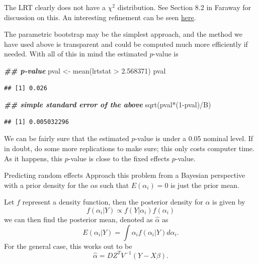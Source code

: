 \documentclass[
  ignorenonframetext,
]{beamer}
\newenvironment{Shaded}{\begin{snugshade}}{\end{snugshade}}
\newcommand{\DecValTok}[1]{\textcolor[rgb]{0.00,0.00,0.81}{#1}}
\newcommand{\DocumentationTok}[1]{\textcolor[rgb]{0.56,0.35,0.01}{\textbf{\textit{#1}}}}
\newcommand{\FloatTok}[1]{\textcolor[rgb]{0.00,0.00,0.81}{#1}}
\newcommand{\FunctionTok}[1]{\textcolor[rgb]{0.00,0.00,0.00}{#1}}
\newcommand{\NormalTok}[1]{#1}
\newcommand{\OtherTok}[1]{\textcolor[rgb]{0.56,0.35,0.01}{#1}}
\newcommand{\SpecialCharTok}[1]{\textcolor[rgb]{0.00,0.00,0.00}{#1}}
\begin{document}
\begin{frame}[fragile]{}
\protect\hypertarget{section-6}{}
The LRT clearly does not have a \(\chi^2\) distribution. See Section 8.2
in Faraway for discussion on this. An interesting refinement can be seen
\href{https://www.sciencedirect.com/science/article/pii/S0167947307004306?casa_token=z-BkV1gXcLQAAAAA:FbUGOMy6WR2WFBfIZ2e1OfpJBpzhhQd4zc3OFtNjUGiaCdlXKa4yQOwbw3xcgPXQ-JaZMbUuLQ}{here}.

The parametric bootstrap may be the simplest approach, and the method we
have used above is transparent and could be computed much more
efficiently if needed. With all of this in mind the estimated
\(p\)-value is

\vspace{12pt}
\tiny

\begin{Shaded}
\begin{Highlighting}[]
\DocumentationTok{\#\# p{-}value}
\NormalTok{pval }\OtherTok{\textless{}{-}} \FunctionTok{mean}\NormalTok{(lrtstat }\SpecialCharTok{\textgreater{}} \FloatTok{2.568371}\NormalTok{)}
\NormalTok{pval}
\end{Highlighting}
\end{Shaded}

\begin{verbatim}
## [1] 0.026
\end{verbatim}

\begin{Shaded}
\begin{Highlighting}[]
\DocumentationTok{\#\# simple standard error of the above}
\FunctionTok{sqrt}\NormalTok{(pval}\SpecialCharTok{*}\NormalTok{(}\DecValTok{1}\SpecialCharTok{{-}}\NormalTok{pval)}\SpecialCharTok{/}\NormalTok{B)}
\end{Highlighting}
\end{Shaded}

\begin{verbatim}
## [1] 0.005032296
\end{verbatim}

\vspace{12pt}
\normalsize

We can be fairly sure that the estimated \(p\)-value is under a 0.05
nominal level. If in doubt, do some more replications to make sure; this
only costs computer time. As it happens, this \(p\)-value is close to
the fixed effects \(p\)-value.
\end{frame}

\begin{frame}{Predicting random effects}
\protect\hypertarget{predicting-random-effects}{}
Approach this problem from a Bayesian perspective with a prior density
for the \(\alpha\)s such that \(E(\alpha_i) = 0\) is just the prior
mean.

Let \(f\) represent a density function, then the posterior density for
\(\alpha\) is given by \[
  f(\alpha_i|Y) \propto f(Y|\alpha_i)f(\alpha_i)
\] we can then find the posterior mean, denoted as \(\hat{\alpha}\) as
\[
  E(\alpha_i|Y) = \int \alpha_i f(\alpha_i|Y) d\alpha_i.
\] For the general case, this works out to be \[
  \hat\alpha = DZ^TV^{-1}(Y - X\beta).
\]
\end{frame}
\end{document}
